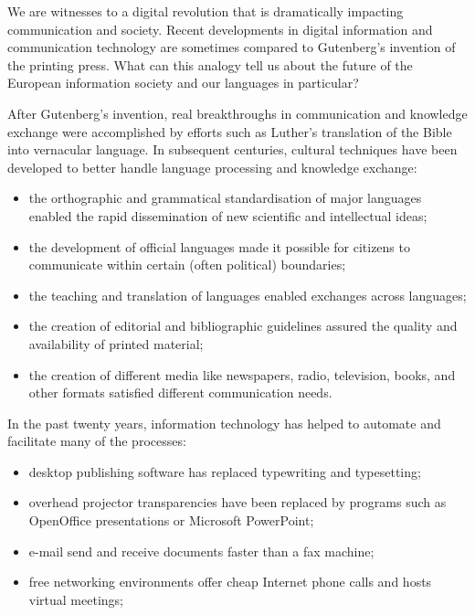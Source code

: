 \documentclass[]{../../metanetpaper}
\begin{document}
\begin{multicols}{2}

We are witnesses to a digital revolution that is dramatically impacting
communication and society. Recent developments in digital information and
communication technology are sometimes compared to Gutenberg’s invention of the
printing press. What can this analogy tell us about the future of the European
information society and our languages in particular?

After Gutenberg’s invention, real breakthroughs in communication and knowledge
exchange were accomplished by efforts such as Luther’s translation of the Bible
into vernacular language. In subsequent centuries, cultural techniques have
been developed to better handle language processing and knowledge exchange:
\begin{itemize}
\item the orthographic and grammatical standardisation of major languages enabled the
rapid dissemination of new scientific and intellectual ideas;

\item the development of official languages made it possible for citizens to
communicate within certain (often political) boundaries;

\item the teaching and translation of languages enabled exchanges across languages;

\item the creation of editorial and bibliographic guidelines assured the quality and
availability of printed material;

\item the creation of different media like newspapers, radio, television, books, and
other formats satisfied different communication needs.
\end{itemize}
In the past twenty years, information technology has helped to automate and
facilitate many of the processes:
\begin{itemize}
\item desktop publishing software has replaced typewriting and typesetting;

\item overhead projector transparencies have been replaced by programs such as
OpenOffice presentations or Microsoft PowerPoint;

\item e-mail send and receive documents faster than a fax machine;

\item free networking environments offer cheap Internet phone calls and hosts virtual
meetings;


\end{itemize}
\end{multicols}
\end{document}
